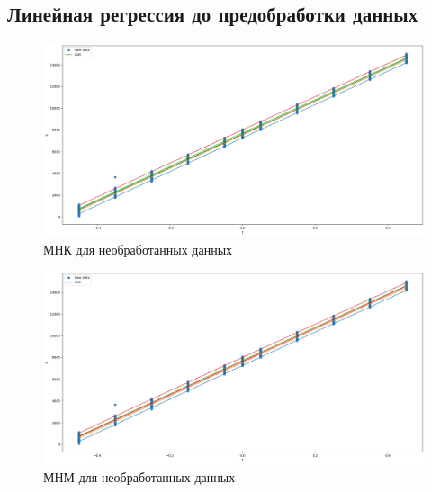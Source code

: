 \documentclass[12pt,a4paper]{article}
\begin{document}
\subsection{Линейная регрессия до предобработки данных}
\begin{figure}[htbp!]
    \begin{center}
        \includegraphics[width = 0.6\linewidth]{plots/LSM_unfiltered.png}
        \caption{МНК для необработанных данных}
    \end{center}
\end{figure}
\begin{figure}[htbp!]
    \begin{center}
        \includegraphics[width = 0.6\linewidth]{plots/LAD_unfiltered.png}
        \caption{МНМ для необработанных данных}
    \end{center}
\end{figure}
\end{document}
